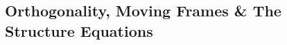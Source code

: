 \begin{exercises}
\begin{enumerate}
		
		
	  
		
	\end{enumerate}
\end{exercises}



\clearpage



\subsection{Orthogonality, Moving Frames \& The Structure Equations}\label{sec:orth}

